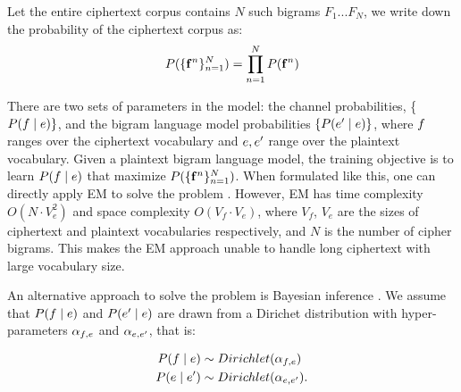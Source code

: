 Let the entire ciphertext corpus contains $N$ such bigrams $F_{1}...F_{N}$, we write down the probability of the ciphertext corpus as:
%
\[
\label{p_corpus}
P( \{ \mathbf{f}^n \}_{n=1}^{N} ) =  \prod_{n=1}^{N} P(\mathbf{f}^{n})
\]
%

There are two sets of parameters in the model: the channel probabilities, \{ $P(f \mid e) \} $, and the bigram language model probabilities $\{ P(e' \mid e) \} $, where $f$ ranges over the ciphertext vocabulary and $e,e'$ range over the plaintext vocabulary. Given a plaintext bigram language model, the training objective is to learn $P(f \mid e)$ that maximize $P( \{ \mathbf{f}^n \}_{n=1}^{N} )$. When formulated like this, one can directly apply EM to solve the problem \cite{knight-EtAl:2006}. However, EM has time complexity $O( N\cdot V_{e}^{2})$ and space complexity $O(V_{f}\cdot V_{e})$, where $V_{f}$, $V_{e}$ are the sizes of ciphertext and plaintext vocabularies respectively, and $N$ is the number of cipher bigrams. This makes the EM approach unable to handle long ciphertext with large vocabulary size. 

An alternative approach to solve the problem is Bayesian inference \cite{ravi-knight:2011}. We assume that $P(f \mid e)$ and $P(e' \mid e)$ are drawn from a Dirichet distribution with hyper-parameters $\alpha_{f,e}$ and $\alpha_{e,e'}$, that is: 

\begin{align*}
P(f \mid e) & \sim Dirichlet(\alpha_{f,e}) \\ 
P(e \mid e') & \sim Dirichlet(\alpha_{e,e'}).
\end{align*}

